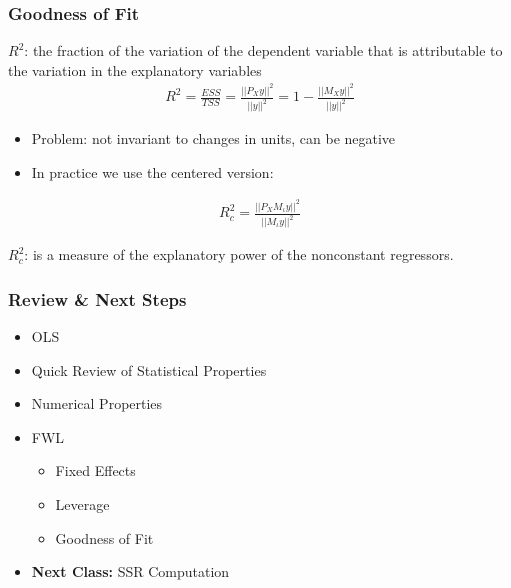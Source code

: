 \documentclass[
  shownotes,
  xcolor={svgnames},
  hyperref={colorlinks,citecolor=DarkBlue,linkcolor=DarkRed,urlcolor=DarkBlue}
  , aspectratio=169]{beamer}
\begin{document}
\begin{frame}
\frametitle{Goodness of Fit}
{\bf $R^2$}: the fraction of the variation of the dependent variable that is attributable to the variation in the explanatory variables
\bigskip
\begin{align}
R^2 = \frac{ESS}{TSS}=\frac{||P_Xy||^2}{||y||^2}=1-\frac{||M_Xy||^2}{||y||^2}
\end{align}

\begin{itemize}
  \item Problem:  not invariant to changes in units, can be negative
  \item In practice we use the centered version:
\end{itemize}

\begin{align}
R^2_c=\frac{||P_XM_\iota y||^2}{||M_\iota y||^2}
\end{align}

{\bf $R^2_c$}: is a measure of the explanatory power of the nonconstant regressors.


\end{frame}
\begin{frame}
\frametitle{Review \& Next Steps}
  
  \begin{itemize} 
    \item OLS
    \medskip
    \item Quick Review of Statistical Properties
    \medskip
    \item Numerical Properties
    \medskip
    \item FWL
    \begin{itemize}
    \item Fixed Effects
    \item Leverage
    \item Goodness of Fit
  \end{itemize}
  \bigskip  

  
  \item  {\bf Next Class:} SSR Computation
  
  
  \end{itemize}


\end{frame}
\end{document}
